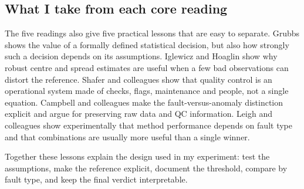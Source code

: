 \subsection*{What I take from each core reading}

The five readings also give five practical lessons that are easy to separate.
Grubbs shows the value of a formally defined statistical decision, but also
how strongly such a decision depends on its assumptions. Iglewicz and
Hoaglin show why robust centre and spread estimates are useful when a few
bad observations can distort the reference. Shafer and colleagues show that
quality control is an operational system made of checks, flags, maintenance
and people, not a single equation. Campbell and colleagues make the
fault-versus-anomaly distinction explicit and argue for preserving raw data
and QC information. Leigh and colleagues show experimentally that method
performance depends on fault type and that combinations are usually more
useful than a single winner.

Together these lessons explain the design used in my experiment: test the
assumptions, make the reference explicit, document the threshold, compare by
fault type, and keep the final verdict interpretable.

